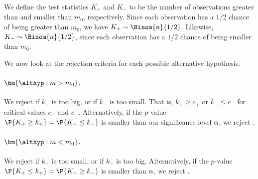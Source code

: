 We define the test statistics $K_+$ and $K_-$ to be the number of observations greater than and smaller than $m_0$, respectively. Since each observation has a $1/2$ chance of being greater than $m_0$, we have $K_+ \sim \Binom{n}{1/2}$. Likewise, $K_- \sim \Binom{n}{1/2}$, since each observation has a $1/2$ chance of being smaller than $m_0$.

We now look at the rejection criteria for each possible alternative hypothesis.

\paragraph{$\bm{\althyp: m > m_0}$.} We reject \nullhyp{} if $k_+$ is too big, or if $k_-$ is too small. That is, $k_+ \geq c_+$ or $k_- \leq c_-$ for critical values $c_+$ and $c_-$. Alternatively, if the $p$-value $\P{K_+ \geq k_+} = \P{K_- \leq k_-}$ is smaller than our significance level $\alpha$, we reject \nullhyp.

\begin{figure}[H]
    \centering
    \caption{}
\end{figure}

\paragraph{$\bm{\althyp: m < m_0}$.} We reject \nullhyp{} if $k_+$ is too small, or if $k_-$ is too big. Alternatively, if the $p$-value $\P{K_+ \leq k_+} = \P{K_- \geq k_-}$ is smaller than $\alpha$, we reject \nullhyp.


